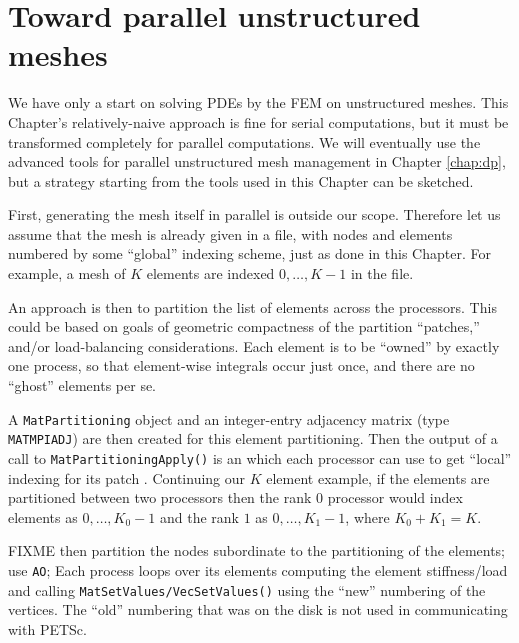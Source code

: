 \section{Toward parallel unstructured meshes}

We have only a start on solving PDEs by the FEM on unstructured meshes.  This Chapter's relatively-naive approach is fine for serial computations, but it must be transformed completely for parallel computations.  We will eventually use the advanced \PETSc tools for parallel unstructured mesh management in Chapter \ref{chap:dp}, but a strategy starting from the tools used in this Chapter can be sketched.

First, generating the mesh itself in parallel is outside our scope.  Therefore let us assume that the mesh is already given in a file, with nodes and elements numbered by some ``global'' indexing scheme, just as done in this Chapter.  For example, a mesh of $K$ elements are indexed $0,\dots,K-1$ in the file.

An approach is then to partition the list of elements across the processors.  This could be based on goals of geometric compactness of the partition ``patches,'' and/or load-balancing considerations.  Each element is to be ``owned'' by exactly one process, so that element-wise integrals occur just once, and there are no ``ghost'' elements per se.

A \texttt{MatPartitioning} object and an integer-entry adjacency matrix (type \texttt{MATMPIADJ}) are then created for this element partitioning.  Then the output of a call to \texttt{MatPartitioningApply()} is an \pIS which each processor can use to get ``local'' indexing for its patch \citep{petsc-user-ref}.  Continuing our $K$ element example, if the elements are partitioned between two processors then the rank $0$ processor would index elements as $0,\dots,K_0-1$ and the rank $1$ as $0,\dots,K_1-1$, where $K_0+K_1=K$.

FIXME then partition the nodes subordinate to the partitioning of the elements; use \texttt{AO}; Each process loops over its elements computing the element stiffness/load and calling \texttt{MatSetValues/VecSetValues()} using the ``new'' numbering of the vertices.  The ``old'' numbering that was on the disk is not used in communicating with PETSc.

